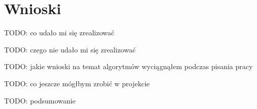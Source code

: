 \documentclass[polish]{standalone}
\begin{document}
\pagestyle{headings}

\chapter{Wnioski}

TODO: co udało mi się zrealizować

TODO: czego nie udało mi się zrealizować

TODO: jakie wnioski na temat algorytmów wyciągnąłem podczas pisania pracy

TODO: co jeszcze mógłbym zrobić w projekcie

TODO: podsumowanie
\end{document}
